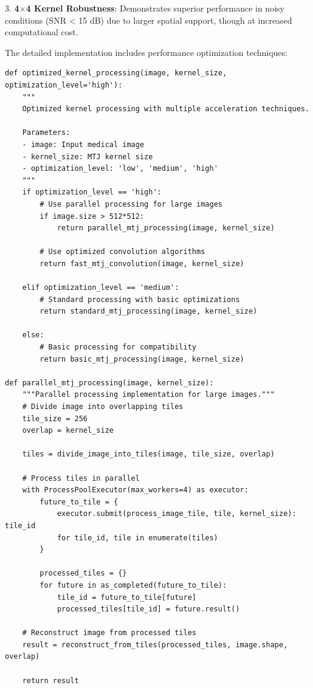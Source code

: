 \documentclass[conference]{IEEEtran}
\begin{document}
3. \textbf{4$\times$4 Kernel Robustness}: Demonstrates superior performance in noisy conditions (SNR < 15 dB) due to larger spatial support, though at increased computational cost.

The detailed implementation includes performance optimization techniques:

\begin{lstlisting}[caption={Performance optimization implementation}]
def optimized_kernel_processing(image, kernel_size, optimization_level='high'):
    """
    Optimized kernel processing with multiple acceleration techniques.
    
    Parameters:
    - image: Input medical image
    - kernel_size: MTJ kernel size
    - optimization_level: 'low', 'medium', 'high'
    """
    if optimization_level == 'high':
        # Use parallel processing for large images
        if image.size > 512*512:
            return parallel_mtj_processing(image, kernel_size)
        
        # Use optimized convolution algorithms
        return fast_mtj_convolution(image, kernel_size)
    
    elif optimization_level == 'medium':
        # Standard processing with basic optimizations
        return standard_mtj_processing(image, kernel_size)
    
    else:
        # Basic processing for compatibility
        return basic_mtj_processing(image, kernel_size)

def parallel_mtj_processing(image, kernel_size):
    """Parallel processing implementation for large images."""
    # Divide image into overlapping tiles
    tile_size = 256
    overlap = kernel_size
    
    tiles = divide_image_into_tiles(image, tile_size, overlap)
    
    # Process tiles in parallel
    with ProcessPoolExecutor(max_workers=4) as executor:
        future_to_tile = {
            executor.submit(process_image_tile, tile, kernel_size): tile_id 
            for tile_id, tile in enumerate(tiles)
        }
        
        processed_tiles = {}
        for future in as_completed(future_to_tile):
            tile_id = future_to_tile[future]
            processed_tiles[tile_id] = future.result()
    
    # Reconstruct image from processed tiles
    result = reconstruct_from_tiles(processed_tiles, image.shape, overlap)
    
    return result


\end{lstlisting}
\end{document}
